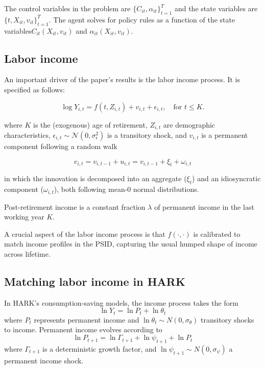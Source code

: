 \documentclass[./CGMPort.tex]{subfiles}
\begin{document}
The control variables in the problem are $\{C_{it}, \alpha_{it}\}^T_{t=1}$ and the state variables are $\{t, X_{it}, v_{it} \}^T_{t=1}$. The agent solves for  policy rules as a function of the state variables\textemdash $C_{it}(X_{it}, v_{it})$ and $\alpha_{it}(X_{it}, v_{it})$.

\subsection{Labor income}

An important driver of the paper's results is the labor income process. It is specified as follows:

\begin{equation}
\log Y_{i,t} = f(t,Z_{i,t}) + v_{i,t} + \epsilon_{i,t}, \quad \text{for } t\leq K.
\end{equation}

where $K$ is the (exogenous) age of retirement, $Z_{i,t}$ are demographic characteristics, $\epsilon_{i,t}\sim \mathcal{N}(0,\sigma^2_\epsilon)$ is a transitory shock, and  $v_{i,t}$ is a permanent component following a random walk

\begin{equation}
v_{i,t} = v_{i,t-1} + u_{i,t} = v_{i,t-1} + \xi_t + \omega_{i,t}
\end{equation}

in which the innovation is decomposed into an aggregate ($\xi_t$) and an idiosyncratic component ($\omega_{i,t}$), both following mean-0 normal distributions.

Post-retirement income is a constant fraction $\lambda$ of permanent income in the last working year $K$.

A crucial aspect of the labor income process is that $f(\cdot,\cdot)$ is calibrated to match income profiles in the PSID, capturing the usual humped shape of income across lifetime.

\subsection{Matching labor income in HARK}

In HARK's consumption-saving models, the income process takes the form
\begin{equation}
\ln Y_t = \ln P_t + \ln \theta_t
\end{equation}
where $P_t$ represents permanent income and $\ln \theta_t \sim N(0,\sigma_\theta)$ transitory shocks to income. Permanent income evolves according to
\begin{equation}
\ln P_{t+1} = \ln \Gamma_{t+1} +  \ln \psi_{t+1} + \ln P_t
\end{equation}
where $\Gamma_{t+1}$ is a deterministic growth factor, and $\ln \psi_{t+1} \sim N(0,\sigma_\psi)$ a permanent income shock. 
\end{document}
